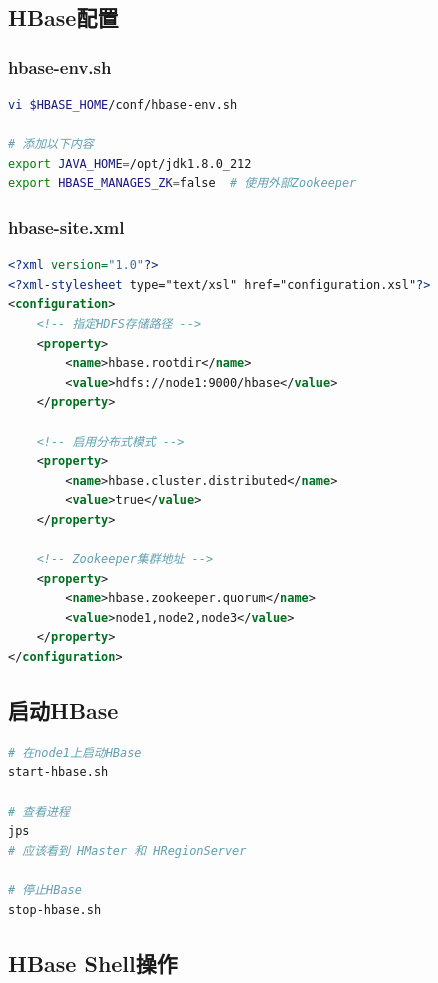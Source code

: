 \documentclass[12pt,a4paper]{article}
\begin{document}
\subsection{HBase配置}

\subsubsection{hbase-env.sh}

\begin{lstlisting}[language=bash]
vi $HBASE_HOME/conf/hbase-env.sh

# 添加以下内容
export JAVA_HOME=/opt/jdk1.8.0_212
export HBASE_MANAGES_ZK=false  # 使用外部Zookeeper
\end{lstlisting}

\subsubsection{hbase-site.xml}

\begin{lstlisting}[language=XML]
<?xml version="1.0"?>
<?xml-stylesheet type="text/xsl" href="configuration.xsl"?>
<configuration>
    <!-- 指定HDFS存储路径 -->
    <property>
        <name>hbase.rootdir</name>
        <value>hdfs://node1:9000/hbase</value>
    </property>
    
    <!-- 启用分布式模式 -->
    <property>
        <name>hbase.cluster.distributed</name>
        <value>true</value>
    </property>
    
    <!-- Zookeeper集群地址 -->
    <property>
        <name>hbase.zookeeper.quorum</name>
        <value>node1,node2,node3</value>
    </property>
</configuration>
\end{lstlisting}

\subsection{启动HBase}

\begin{lstlisting}[language=bash]
# 在node1上启动HBase
start-hbase.sh

# 查看进程
jps
# 应该看到 HMaster 和 HRegionServer

# 停止HBase
stop-hbase.sh
\end{lstlisting}

\subsection{HBase Shell操作}
\end{document}
